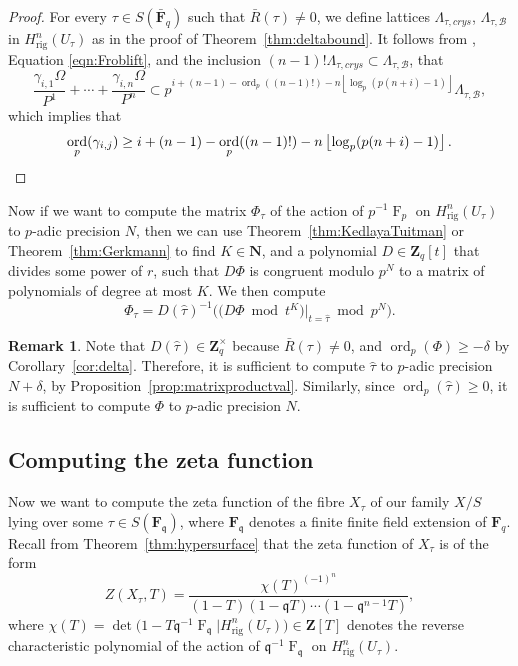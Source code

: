 \documentclass[a4paper,11pt]{article}
\numberwithin{equation}{section}
\providecommand{\floor}[1]{\left\lfloor#1\right\rfloor}   %
\newcommand{\NN}{\mathbf{N}} %
\newcommand{\ZZ}{\mathbf{Z}} %
\newcommand{\FF}{\mathbf{F}} %
\DeclareMathOperator{\ord}{ord}          %
\DeclareMathOperator{\Frob}{F}           %
\providecommand{\Hrig}{H_{\text{rig}}}  %
\providecommand{\cB}{\mathcal{B}} %
\theoremstyle{definition}
\newtheorem{rem}[thm]{Remark}
\begin{document}
\begin{proof}
For every $\tau \in S(\bar{\FF}_q)$ such that $\bar{R}(\tau) \neq 0$, we
define lattices $\Lambda_{\tau,crys}$, $\Lambda_{\tau,\cB}$ in $\Hrig^n(U_{\tau})$
as in the proof of Theorem~\ref{thm:deltabound}. It follows from
\citep[Proposition 3.4.6]{AbbottKedlayaRoe2006}, Equation \eqref{eqn:Froblift}, 
and the inclusion $(n-1)!\Lambda_{\tau,crys} \subset \Lambda_{\tau,\cB}$, that
\begin{equation*}
\frac{\gamma_{i,1} \Omega}{P^1}+\dotsb+\frac{\gamma_{i,n} \Omega}{P^n} \subset 
p^{i+(n-1)-\ord_p((n-1)!)-n \floor{\log_p(p(n+i)-1)}} \Lambda_{\tau,\cB},
\end{equation*}
which implies that
\begin{equation*}
\ord_p(\gamma_{i,j}) \geq i+(n-1) - \ord_p((n-1)!) - n \floor{\log_p(p(n+i)-1)}.
\qedhere
\end{equation*}
\end{proof}

Now if we want to compute the matrix $\Phi_{\tau}$ of the action of 
$p^{-1} \Frob_p$ on $\Hrig^{n}(U_{\tau})$ to $p$-adic precision $N$, 
then we can use Theorem~\ref{thm:KedlayaTuitman} or Theorem~\ref{thm:Gerkmann}
to find $K \in \NN$, 
and a polynomial $D \in \ZZ_q[t]$ that divides some power of $r$, such that 
$D \Phi$ is congruent modulo $p^N$ to a matrix of polynomials of degree 
at most $K$. 
We then compute
\begin{equation*}
\Phi_{\tau} = D(\hat{\tau})^{-1} \bigl( \bigl( D \Phi \bmod{t^{K}} \bigr)|_{t=\hat{\tau}} \bmod{p^{N}} \bigr).
\end{equation*}

\begin{rem} \label{rem:prectau}
Note that $D(\hat{\tau}) \in \ZZ_q^{\times}$ because $\bar{R}(\tau) \neq 0$, 
and $\ord_p(\Phi) \geq -\delta$ by Corollary~\ref{cor:delta}. Therefore, it 
is sufficient to compute $\hat{\tau}$ to $p$-adic precision $N+\delta$, by
Proposition~\ref{prop:matrixproductval}. Similarly, since $\ord_p(\hat{\tau}) \geq 0$, 
it is sufficient to compute $\Phi$ to $p$-adic 
precision $N$.
\end{rem}

\subsection{Computing the zeta function}

Now we want to compute the zeta function of the fibre $X_{\tau}$ of
our family $X/S$ lying over some $\tau \in S(\FF_{\mathfrak{q}})$, 
where $\FF_{\mathfrak{q}}$ denotes a finite finite field extension of $\FF_q$.  
Recall from Theorem~\ref{thm:hypersurface} 
that the zeta function of $X_{\tau}$ is of the form
\begin{equation*}
Z(X_{\tau},T) = \frac{\chi(T)^{(-1)^n}}{(1 - T) (1 - \mathfrak{q}T) \dotsm (1 - \mathfrak{q}^{n-1}T)},
\end{equation*}
where $\chi(T) = \det \bigl( 1 - T \mathfrak{q}^{-1} \Frob_{\mathfrak{q}} | \Hrig^n(U_{\tau}) \bigr) \in \ZZ[T]$ 
denotes the reverse characteristic polynomial of the action 
of $\mathfrak{q}^{-1} \Frob_{\mathfrak{q}}$ 
on $\Hrig^n(U_{\tau})$.
\end{document}
